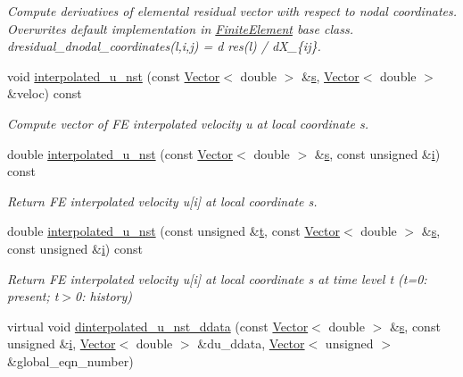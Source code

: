 \begin{DoxyCompactItemize}
\begin{DoxyCompactList}\small\item\em Compute derivatives of elemental residual vector with respect to nodal coordinates. Overwrites default implementation in \hyperlink{classoomph_1_1FiniteElement}{Finite\+Element} base class. dresidual\+\_\+dnodal\+\_\+coordinates(l,i,j) = d res(l) / d\+X\+\_\+\{ij\}. \end{DoxyCompactList}\item 
void \hyperlink{classoomph_1_1GeneralisedNewtonianNavierStokesEquations_a97044dd1b2e16ffca4a5e85a397e4e61}{interpolated\+\_\+u\+\_\+nst} (const \hyperlink{classoomph_1_1Vector}{Vector}$<$ double $>$ \&\hyperlink{cfortran_8h_ab7123126e4885ef647dd9c6e3807a21c}{s}, \hyperlink{classoomph_1_1Vector}{Vector}$<$ double $>$ \&veloc) const
\begin{DoxyCompactList}\small\item\em Compute vector of FE interpolated velocity u at local coordinate s. \end{DoxyCompactList}\item 
double \hyperlink{classoomph_1_1GeneralisedNewtonianNavierStokesEquations_aa5de92e38d9f173c011020b65e425516}{interpolated\+\_\+u\+\_\+nst} (const \hyperlink{classoomph_1_1Vector}{Vector}$<$ double $>$ \&\hyperlink{cfortran_8h_ab7123126e4885ef647dd9c6e3807a21c}{s}, const unsigned \&\hyperlink{cfortran_8h_adb50e893b86b3e55e751a42eab3cba82}{i}) const
\begin{DoxyCompactList}\small\item\em Return FE interpolated velocity u\mbox{[}i\mbox{]} at local coordinate s. \end{DoxyCompactList}\item 
double \hyperlink{classoomph_1_1GeneralisedNewtonianNavierStokesEquations_ae10227e1807c37cd6acd9fafa553a482}{interpolated\+\_\+u\+\_\+nst} (const unsigned \&\hyperlink{cfortran_8h_af6f0bd3dc13317f895c91323c25c2b8f}{t}, const \hyperlink{classoomph_1_1Vector}{Vector}$<$ double $>$ \&\hyperlink{cfortran_8h_ab7123126e4885ef647dd9c6e3807a21c}{s}, const unsigned \&\hyperlink{cfortran_8h_adb50e893b86b3e55e751a42eab3cba82}{i}) const
\begin{DoxyCompactList}\small\item\em Return FE interpolated velocity u\mbox{[}i\mbox{]} at local coordinate s at time level t (t=0\+: present; t$>$0\+: history) \end{DoxyCompactList}\item 
virtual void \hyperlink{classoomph_1_1GeneralisedNewtonianNavierStokesEquations_a063505006e63d4a65f90f7a6409a9401}{dinterpolated\+\_\+u\+\_\+nst\+\_\+ddata} (const \hyperlink{classoomph_1_1Vector}{Vector}$<$ double $>$ \&\hyperlink{cfortran_8h_ab7123126e4885ef647dd9c6e3807a21c}{s}, const unsigned \&\hyperlink{cfortran_8h_adb50e893b86b3e55e751a42eab3cba82}{i}, \hyperlink{classoomph_1_1Vector}{Vector}$<$ double $>$ \&du\+\_\+ddata, \hyperlink{classoomph_1_1Vector}{Vector}$<$ unsigned $>$ \&global\+\_\+eqn\+\_\+number)

\end{DoxyCompactItemize}
